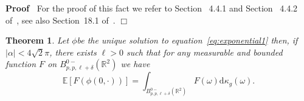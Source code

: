 \documentclass[a4paper,10pt]{article}
\newcommand{\mathd}{\mathrm{d}}
\newenvironment{proof}{\noindent\textbf{Proof\ }}{\hspace*{\fill}$\Box$\medskip}
\newtheorem{theorem}{Theorem}
\begin{document}
\begin{proof}
  For the proof of this fact we refer to Section ~4.4.1 and Section ~4.4.2
  of~{\cite{Triebel1992}}, see also Section~18.1 of~{\cite{Triebel1997}}.
\end{proof}

\begin{theorem}
  \label{theorem_dimensionalreduction1}Let $\phi$be the unique solution to
  equation~{\eqref{eq:exponential1}} then, if $| \alpha | < 4 \sqrt{2} \pi$,
  there exists $\ell > 0$ such that for any measurable and bounded function
  $F$ on $B^{0 -}_{p, p, \ell + \delta} (\mathbb{R}^2)$ we have
  \begin{equation}
    \mathbb{E} [F (\phi (0, \cdot))] = \int_{B^{0 -}_{p, p, \ell + \delta}
    (\mathbb{R}^2)} F (\omega) \mathd \kappa_g (\omega) . \label{eq:final}
  \end{equation}
\end{theorem}
\end{document}
